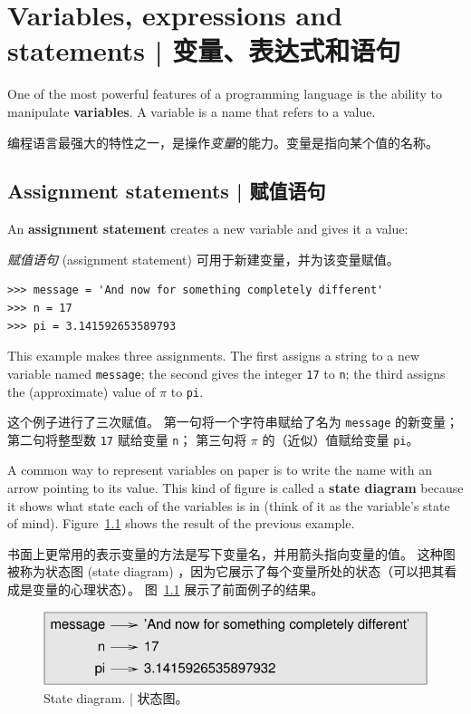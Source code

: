 


\chapter{Variables, expressions and statements  |  变量、表达式和语句}

One of the most powerful features of a programming language is the
ability to manipulate {\bf variables}.  A variable is a name that
refers to a value.

编程语言最强大的特性之一，是操作\emph{变量}的能力。变量是指向某个值的名称。
  


\section{Assignment statements  |  赋值语句}
\label{variables}
  

An {\bf assignment statement} creates a new variable and gives
it a value:

\emph{赋值语句} (assignment statement) 可用于新建变量，并为该变量赋值。

\begin{lstlisting}
>>> message = 'And now for something completely different'
>>> n = 17
>>> pi = 3.141592653589793
\end{lstlisting}
%
This example makes three assignments.  The first assigns a string
to a new variable named {\tt message};
the second gives the integer {\tt 17} to {\tt n}; the third
assigns the (approximate) value of $\pi$ to {\tt pi}.

这个例子进行了三次赋值。 第一句将一个字符串赋给了名为 \lstinline{message} 的新变量； 第二句将整型数 \lstinline{17} 赋给变量 \lstinline{n}； 第三句将 $\pi$ 的（近似）值赋给变量 \lstinline{pi}。
  

A common way to represent variables on paper is to write the name with
an arrow pointing to its value.  This kind of figure is
called a {\bf state diagram} because it shows what state each of the
variables is in (think of it as the variable's state of mind).
Figure~\ref{fig.state2} shows the result of the previous example.

书面上更常用的表示变量的方法是写下变量名，并用箭头指向变量的值。 这种图被称为状态图 (state diagram) ，因为它展示了每个变量所处的状态（可以把其看成是变量的心理状态）。 图~\ref{fig.state2} 展示了前面例子的结果。

\begin{figure}
\centerline
{\includegraphics[scale=0.8]{../source/figs/state2.pdf}}
\caption{State diagram.  |  状态图。}
\label{fig.state2}
\end{figure}



